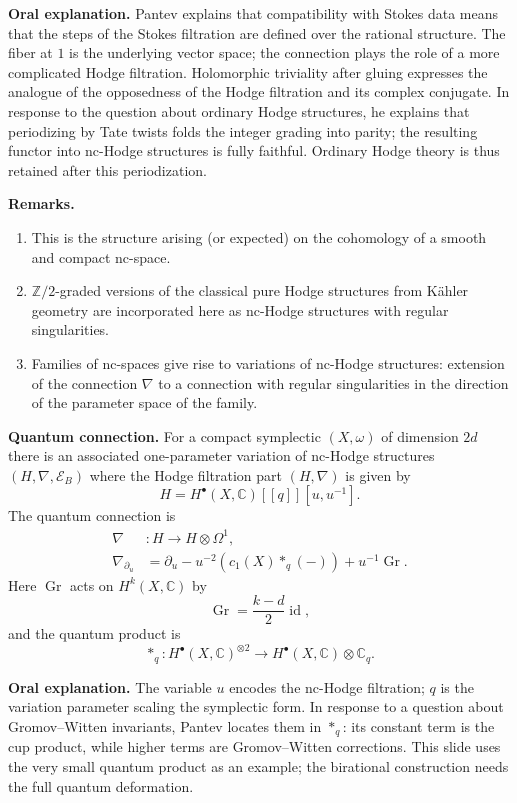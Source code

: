 \medskip\noindent
\textbf{Oral explanation.}
Pantev explains that compatibility with
Stokes data means that the steps of the
Stokes filtration are defined over the
rational structure. The fiber at $1$ is the
underlying vector space; the connection
plays the role of a more complicated Hodge
filtration. Holomorphic triviality after
gluing expresses the analogue of the
opposedness of the Hodge filtration and its
complex conjugate. In response to the
question about ordinary Hodge structures,
he explains that periodizing by Tate twists
folds the integer grading into parity; the
resulting functor into nc-Hodge structures
is fully faithful. Ordinary Hodge theory
is thus retained after this periodization.

\medskip\noindent
\textbf{Remarks.}
\begin{enumerate}
\item This is the structure arising
(or expected) on the cohomology of a
smooth and compact nc-space.
\item $\mathbb Z/2$-graded versions of the
classical pure Hodge structures from
K\"ahler geometry are incorporated here
as nc-Hodge structures with regular
singularities.
\item Families of nc-spaces give rise to
variations of nc-Hodge structures:
extension of the connection $\nabla$ to a
connection with regular singularities in
the direction of the parameter space of
the family.
\end{enumerate}

\medskip\noindent
\textbf{Quantum connection.}
For a compact symplectic $(X,\omega)$ of
dimension $2d$ there is an associated
one-parameter variation of nc-Hodge
structures $(H,\nabla,\mathcal E_B)$ where
the Hodge filtration part $(H,\nabla)$ is
 given by
$$
H=H^\bullet(X,\mathbb C)[[q]][u,u^{-1}].
$$
The quantum connection is
$$
\begin{aligned}
\nabla &:H\longrightarrow H\otimes\Omega^1,\\
\nabla_{\partial_u}
&=\partial_u-u^{-2}(c_1(X)*_q(-))
+u^{-1}\operatorname{Gr}.
\end{aligned}
$$
Here $\operatorname{Gr}$ acts on
$H^k(X,\mathbb C)$ by
$$
\operatorname{Gr}=\frac{k-d}{2}
\operatorname{id},
$$
and the quantum product is
$$
*_q:H^\bullet(X,\mathbb C)^{\otimes2}
\longrightarrow H^\bullet(X,\mathbb C)
\otimes\mathbb C_q.
$$

\medskip\noindent
\textbf{Oral explanation.}
The variable $u$ encodes the nc-Hodge
filtration; $q$ is the variation parameter
scaling the symplectic form. In response to
a question about Gromov--Witten invariants,
Pantev locates them in $*_q$: its constant
term is the cup product, while higher terms
are Gromov--Witten corrections. This slide
uses the very small quantum product as an
example; the birational construction needs
the full quantum deformation.

